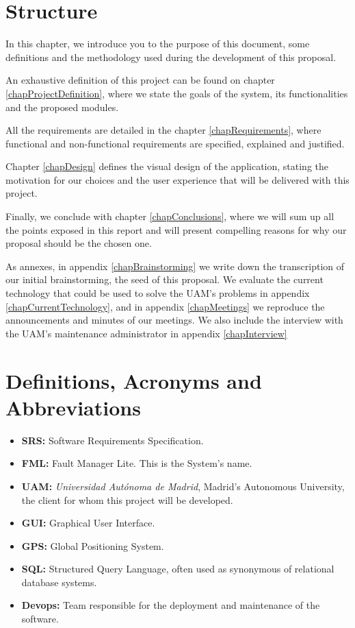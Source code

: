 \documentclass{report}
\begin{document}
\section{Structure}

In this chapter, we introduce you to the purpose of this document, some definitions and the methodology used during the development of this proposal.

An exhaustive definition of this project can be found on chapter \ref{chapProjectDefinition}, where we state the goals of the system, its functionalities and the proposed modules.

All the requirements are detailed in the chapter \ref{chapRequirements}, where functional and non-functional requirements are specified, explained and justified.

Chapter \ref{chapDesign} defines the visual design of the application, stating the motivation for our choices and the user experience that will be delivered with this project.

Finally, we conclude with chapter \ref{chapConclusions}, where we will sum up all the points exposed in this report and will present compelling reasons for why our proposal should be the chosen one.

As annexes, in appendix \ref{chapBrainstorming} we write down the transcription of our initial brainstorming, the seed of this proposal. We evaluate the current technology that could be used to solve the UAM's problems in appendix \ref{chapCurrentTechnology}, and in appendix \ref{chapMeetings} we reproduce the announcements and minutes of our meetings. We also include the interview with the UAM's maintenance administrator in appendix \ref{chapInterview}


\section{Definitions, Acronyms and Abbreviations}

\begin{itemize}
\item \textbf{SRS: } Software Requirements Specification.

\item \textbf{FML: } Fault Manager Lite. This is the System's name.

\item \textbf{UAM: } \textit{Universidad Autónoma de Madrid}, Madrid's Autonomous University, the client for whom this project will be developed.

\item \textbf{GUI: } Graphical User Interface.

\item \textbf{GPS: } Global Positioning System.

\item \textbf{SQL: } Structured Query Language, often used as synonymous of relational database systems.

\item \textbf{Devops: } Team responsible for the deployment and maintenance of the software.

\end{itemize}
\end{document}

